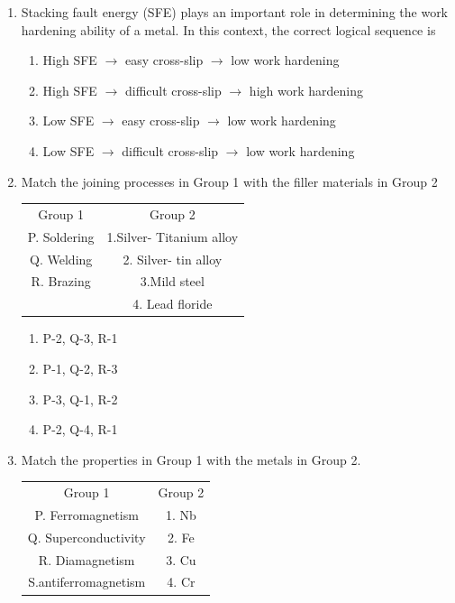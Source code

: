 \documentclass[journal]{IEEEtran}
\theoremstyle{remark}
\begin{document}
\begin{enumerate}
\item  Stacking fault energy (SFE) plays an important role in determining the work hardening ability of a metal. In this context, the correct logical sequence is \hfill{}
\begin{enumerate}
\item  High SFE $\longrightarrow$ easy cross-slip $\longrightarrow$ low work hardening
\item  High SFE $\longrightarrow$ difficult cross-slip $\longrightarrow$  high work hardening
\item  Low SFE $\longrightarrow$ easy cross-slip $\longrightarrow$  low work hardening
\item  Low SFE $\longrightarrow$ difficult cross-slip $\longrightarrow$  low work hardening   
\end{enumerate}
\item Match the joining processes in Group 1 with the filler materials in Group 2\hfill{}
\begin{center}
\begin{tabular}{c c}
Group 1&Group 2\\
P. Soldering&1.Silver- Titanium alloy  \\
Q. Welding     & 2. Silver- tin alloy\\
R. Brazing&3.Mild steel\\
    & 4. Lead floride
\end{tabular}
\end{center}
\begin{multicols}{2}
\begin{enumerate}
        \item P-2, Q-3, R-1
        \item P-1, Q-2, R-3
        \item  P-3, Q-1, R-2
        \item P-2, Q-4, R-1
\end{enumerate}
\end{multicols}
\item  Match the properties in Group 1 with the metals in Group 2.\hfill{}
\begin{center}
\begin{tabular}{c c}
Group 1 &Group 2\\
P.  Ferromagnetism&1. Nb \\
Q.  Superconductivity      & 2.  Fe\\
R. Diamagnetism&3. Cu\\
S.antiferromagnetism   & 4.  Cr
\end{tabular}

\end{center}
\end{enumerate}
\end{document}

